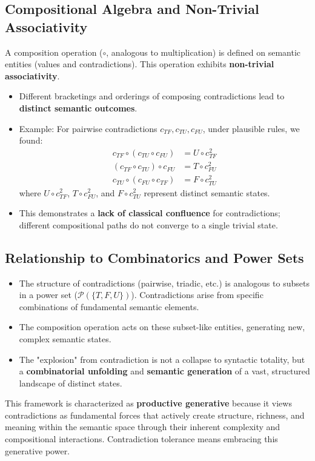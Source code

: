 	\subsection{Compositional Algebra and Non-Trivial Associativity}
	A composition operation ($\circ$, analogous to multiplication) is defined on semantic entities (values and contradictions). This operation exhibits \textbf{non-trivial associativity}.
	\begin{itemize}
		\item Different bracketings and orderings of composing contradictions lead to \textbf{distinct semantic outcomes}.
		\item Example: For pairwise contradictions $c_{TF}, c_{TU}, c_{FU}$, under plausible rules, we found:
		\begin{align*} c_{TF} \circ (c_{TU} \circ c_{FU}) &= U \circ c_{TF}^2 \\ (c_{TF} \circ c_{TU}) \circ c_{FU} &= T \circ c_{FU}^2 \\ c_{TU} \circ (c_{FU} \circ c_{TF}) &= F \circ c_{TU}^2 \end{align*}
		where $U \circ c_{TF}^2$, $T \circ c_{FU}^2$, and $F \circ c_{TU}^2$ represent distinct semantic states.
		\item This demonstrates a \textbf{lack of classical confluence} for contradictions; different compositional paths do not converge to a single trivial state.
	\end{itemize}
	
	\subsection{Relationship to Combinatorics and Power Sets}
	\begin{itemize}
		\item The structure of contradictions (pairwise, triadic, etc.) is analogous to subsets in a power set ($\mathcal{P}(\{T, F, U\})$). Contradictions arise from specific combinations of fundamental semantic elements.
		\item The composition operation acts on these subset-like entities, generating new, complex semantic states.
		\item The "explosion" from contradiction is not a collapse to syntactic totality, but a \textbf{combinatorial unfolding} and \textbf{semantic generation} of a vast, structured landscape of distinct states.
	\end{itemize}
	
	This framework is characterized as \textbf{productive generative} because it views contradictions as fundamental forces that actively create structure, richness, and meaning within the semantic space through their inherent complexity and compositional interactions. Contradiction tolerance means embracing this generative power.
	
